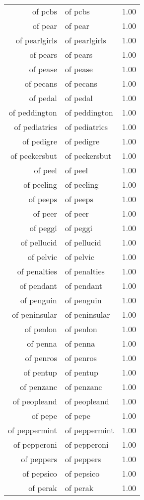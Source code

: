 \begin{table}[ht]
\begin{tabular}{rlr}
  of pcbs & of pcbs & 1.00 \\ 
  of pear & of pear & 1.00 \\ 
  of pearlgirls & of pearlgirls & 1.00 \\ 
  of pears & of pears & 1.00 \\ 
  of pease & of pease & 1.00 \\ 
  of pecans & of pecans & 1.00 \\ 
  of pedal & of pedal & 1.00 \\ 
  of peddington & of peddington & 1.00 \\ 
  of pediatrics & of pediatrics & 1.00 \\ 
  of pedigre & of pedigre & 1.00 \\ 
  of peekersbut & of peekersbut & 1.00 \\ 
  of peel & of peel & 1.00 \\ 
  of peeling & of peeling & 1.00 \\ 
  of peeps & of peeps & 1.00 \\ 
  of peer & of peer & 1.00 \\ 
  of peggi & of peggi & 1.00 \\ 
  of pellucid & of pellucid & 1.00 \\ 
  of pelvic & of pelvic & 1.00 \\ 
  of penalties & of penalties & 1.00 \\ 
  of pendant & of pendant & 1.00 \\ 
  of penguin & of penguin & 1.00 \\ 
  of peninsular & of peninsular & 1.00 \\ 
  of penlon & of penlon & 1.00 \\ 
  of penna & of penna & 1.00 \\ 
  of penros & of penros & 1.00 \\ 
  of pentup & of pentup & 1.00 \\ 
  of penzanc & of penzanc & 1.00 \\ 
  of peopleand & of peopleand & 1.00 \\ 
  of pepe & of pepe & 1.00 \\ 
  of peppermint & of peppermint & 1.00 \\ 
  of pepperoni & of pepperoni & 1.00 \\ 
  of peppers & of peppers & 1.00 \\ 
  of pepsico & of pepsico & 1.00 \\ 
  of perak & of perak & 1.00 \\ 

\end{tabular}
\end{table}
